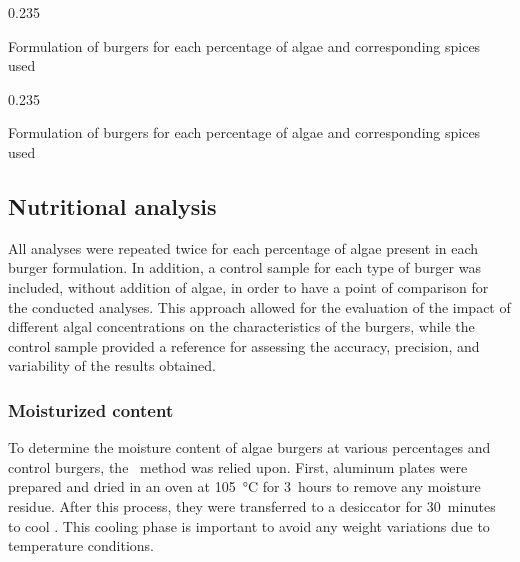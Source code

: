 \begin{table}[H]
\footnotesize
\centering
	\begin{subcaptionblock}{0.68\textwidth}
	\centering
	\end{subcaptionblock}%
\hspace*{\hbtwsfig}%
	\begin{subcaptionblock}[][16.5em][c]{0.235\textwidth}
	\centering
	\end{subcaptionblock}%
\caption{Formulation of  burgers for each percentage of algae and corresponding spices used}
\label{tab:formulation_spices-chlorella}
\end{table}

\begin{table}[H]
\footnotesize
\centering
	\begin{subcaptionblock}{0.5\textwidth}
	\centering
	\end{subcaptionblock}%
\hspace*{\hbtwsfig}%
	\begin{subcaptionblock}[][16em][c]{0.235\textwidth}
	\centering
	\end{subcaptionblock}%
\caption{Formulation of  burgers for each percentage of algae and corresponding spices used}
\label{tab:formulation_spices-palmaria}
\end{table}

\subsection{Nutritional analysis}
All analyses were repeated twice for each percentage of algae present in each burger formulation. In addition, a control sample for each type of burger was included, without addition of algae, in order to have a point of comparison for the conducted analyses. This approach allowed for the evaluation of the impact of different algal concentrations on the characteristics of the burgers, while the control sample provided a reference for assessing the accuracy, precision, and variability of the results obtained.


\subsubsection{Moisturized content}
To determine the moisture content of algae burgers at various percentages and control burgers, the~\cite{aoac_2000}\zxriv{} method was relied upon. First, aluminum plates were prepared and dried in an oven at \qty{105}{\degreeCelsius} for \qty{3}{hours} to remove any moisture residue. After this process, they were transferred to a desiccator for \qty{30}{minutes} to cool . This cooling phase is important to avoid any weight variations due to temperature conditions.

